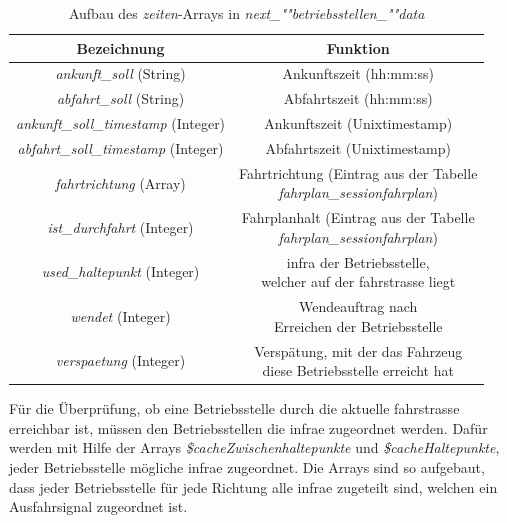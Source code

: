 \begin{table}
\begin{center}
\renewcommand{\arraystretch}{1.2}
\begin{tabular}{c|c}
Bezeichnung & Funktion \\ \hline
\textit{ankunft\_soll} (String)                  		&    Ankunftszeit (hh:mm:ss)                  \\ \hline
\textit{abfahrt\_soll} (String)                  		&     Abfahrtszeit (hh:mm:ss)                 \\ \hline
\textit{ankunft\_soll\_timestamp} (Integer)             	&   Ankunftszeit (Unixtimestamp)              \\ \hline
\textit{abfahrt\_soll\_timestamp} (Integer)             	&    Abfahrtszeit (Unixtimestamp)             \\ \hline
\textit{fahrtrichtung} (Array)                  		&   \makecell{Fahrtrichtung (Eintrag aus der Tabelle\\\textit{fahrplan\_sessionfahrplan})}                  \\ \hline
\textit{ist\_durchfahrt} (Integer)             	&    \makecell{Fahrplanhalt (Eintrag aus der Tabelle\\\textit{fahrplan\_sessionfahrplan})}               \\ \hline
\textit{used\_haltepunkt} (Integer)             	&    \makecell{\ac{infra} der Betriebsstelle,\\welcher auf der \Gls{fahrstrasse} liegt}             \\ \hline
\textit{wendet} (Integer)             	&    \makecell{Wendeauftrag nach\\Erreichen der Betriebsstelle}                \\ \hline
\textit{verspaetung} (Integer)             	&    \makecell{Verspätung, mit der das Fahrzeug\\diese Betriebsstelle erreicht hat}               \\ 
\end{tabular}
\renewcommand{\arraystretch}{1}
\caption{Aufbau des \textit{zeiten}-Arrays in \textit{next\_""betriebs\-stellen\_""data}}
\label{table:betriebsstellenzeiten}
\end{center}
\end{table}
Für die Überprüfung, ob eine Betriebsstelle durch die aktuelle \Gls{fahrstrasse} erreichbar ist, müssen den Betriebsstellen die \ac{infra}e zugeordnet werden. Dafür werden mit Hilfe der Arrays \textit{\$cache\-Zwischen\-halte\-punkte} und \textit{\$cache\-Halte\-punkte}, jeder Betriebsstelle mögliche \ac{infra}e zugeordnet. Die Arrays sind so aufgebaut, dass jeder Betriebsstelle für jede Richtung alle \ac{infra}e zugeteilt sind, welchen ein Ausfahrsignal zugeordnet ist.

